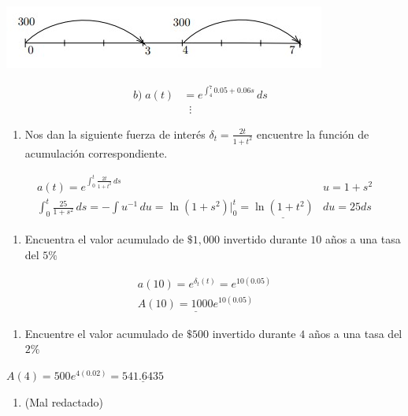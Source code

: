 \documentclass[
]{book}
\providecommand{\tightlist}{%
  \setlength{\itemsep}{0pt}\setlength{\parskip}{0pt}}
\theoremstyle{definition}
\theoremstyle{definition}
\theoremstyle{definition}
\theoremstyle{definition}
\theoremstyle{remark}
\begin{document}
\includegraphics{images/16.jpg}

\begin{align*}
b) \; a(t) &= e ^{\int_{4}^{7} 0.05 + 0.06s} \, ds&\\
&\;\;\vdots&
\end{align*}

\begin{enumerate}
\def\labelenumi{\arabic{enumi}.}
\setcounter{enumi}{5}
\tightlist
\item
  Nos dan la siguiente fuerza de interés \(\delta_t = \frac{2t}{1+t^2}\) encuentre la función de acumulación correspondiente.
\end{enumerate}

\begin{align*}
&a(t) = e^{\int_{0}^{t} \frac{2t}{1+t^2} \, ds}& u = 1+s^2&\\
&\int_{0}^{t} \frac{25}{1+s^2} \, ds = - \int u^{-1}\, du = \ln\left(1+s^2 \right)\big|_0^t = \underline{\ln\left(1+t^2 \right) }  &du = 25ds&
\end{align*}

\begin{enumerate}
\def\labelenumi{\arabic{enumi}.}
\setcounter{enumi}{6}
\tightlist
\item
  Encuentra el valor acumulado de \(\$ 1,000\) invertido durante \(10\) años a una tasa del \(5\%\)
\end{enumerate}

\begin{align*}
&a(10) = e^{\delta_t(t)} = e^{10(0.05)}&\\
&\underline{A(10) = 1000e^{10(0.05)}}&
\end{align*}

\begin{enumerate}
\def\labelenumi{\arabic{enumi}.}
\setcounter{enumi}{7}
\tightlist
\item
  Encuentre el valor acumulado de \(\$500\) invertido durante \(4\) años a una tasa del \(2\%\)
\end{enumerate}

\(A(4) = 500e^{4(0.02)} = \underline{541.6435}\)

\begin{enumerate}
\def\labelenumi{\arabic{enumi}.}
\setcounter{enumi}{8}
\tightlist
\item
  (Mal redactado)
\end{enumerate}
\end{document}
